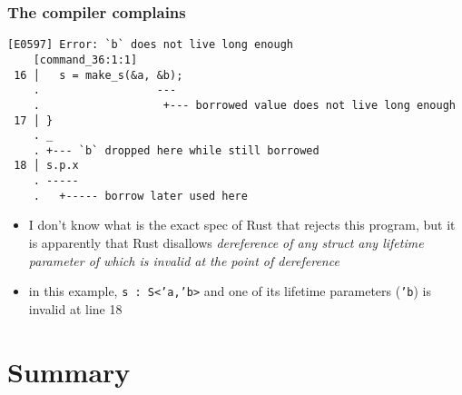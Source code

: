 \documentclass[12pt,dvipdfmx]{beamer}
\newcommand{\ao}[1]{{\color{blue}#1}}
\newcommand{\aka}[1]{{\color{red}#1}}
\begin{document}
\begin{frame}[fragile]
  \frametitle{The compiler complains}
    \begin{lstlisting}
[E0597] Error: `b` does not live long enough
    [command_36:1:1]
 16 │   s = make_s(&a, &b);
    .                  ---
    .                   +--- borrowed value does not live long enough
 17 │ }
    . _
    . +--- `b` dropped here while still borrowed
 18 │ s.p.x
    . -----
    .   +----- borrow later used here
  \end{lstlisting}
  \begin{itemize}
  \item I don't know what is the exact spec of Rust that
    rejects this program, but it is apparently that
    Rust disallows {\it dereference of any struct
      any lifetime parameter of which is invalid at the
      point of dereference}
  \item in this example, {\tt s : S<'a,'b>} and one of
    its lifetime parameters ({\tt 'b}) is invalid at line 18
  \end{itemize}
\end{frame}

\iffalse
\begin{frame}[fragile]
  \frametitle{Note}
  \begin{itemize}
\item if it was
\begin{lstlisting}
fn make_s(@\ao{\tt a: \&T}@, @\aka{\tt b: \&T}@) -> S { S{p: @\aka{\tt b}@, q: @\ao{\tt a}@} }
\end{lstlisting}
then a valid lifetime specification becomes
\begin{lstlisting}
fn make_s(@\ao{\tt a: \&'a T}@, @\aka{\tt b: \&'b T}@) -> @{\tt S<\aka{'b}, \ao{'a}>}@ {
  S{p: @\aka{\tt b}@, q: @\ao{\tt a}@}
}    
\end{lstlisting}
\end{itemize}
\end{frame}
\fi


\section{Summary}
\end{document}
